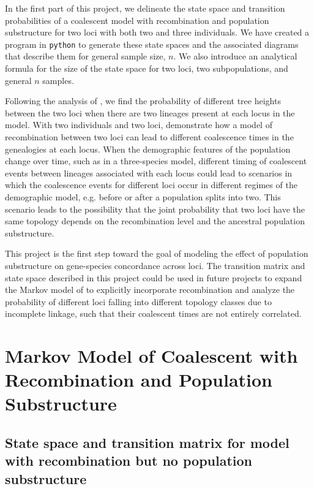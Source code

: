 \documentclass[11pt,oneside]{amsart}
\begin{document}
In the first part of this project, we delineate the state space and transition probabilities of a coalescent model with recombination and population substructure for two loci with both two and three individuals. We have created a program in \texttt{python} to generate these state spaces and the associated diagrams that describe them for general sample size, $n$. We also introduce an analytical formula for the size of the state space for two loci, two subpopulations, and general $n$ samples.

Following the analysis of \cite{SimonsenChurchill1997}, we find the probability of different tree heights between the two loci when there are two lineages present at each locus in the model. With two individuals and two loci, \cite{SimonsenChurchill1997} demonstrate how a model of recombination between two loci can lead to different coalescence times in the genealogies at each locus. When the demographic features of the population change over time, such as in a three-species model, different timing of coalescent events between lineages associated with each locus could lead to scenarios in which the coalescence events for different loci occur in different regimes of the demographic model, e.g. before or after a population splits into two. This scenario leads to the possibility that the joint probability that two loci have the same topology depends on the recombination level and the ancestral population substructure.

This project is the first step toward the goal of modeling the effect of population substructure on gene-species concordance across loci. The transition matrix and state space described in this project could be used in future projects to expand the Markov model of \cite{SlatkinPollack2008} to explicitly incorporate recombination and analyze the probability of different loci falling into different topology classes due to incomplete linkage, such that their coalescent times are not entirely correlated.


\section{Markov Model of Coalescent with Recombination and Population Substructure}
\label{Section: recombination and migration}

\subsection{State space and transition matrix for model with recombination but no population substructure}
\label{Subsection: recomb}
\end{document}
